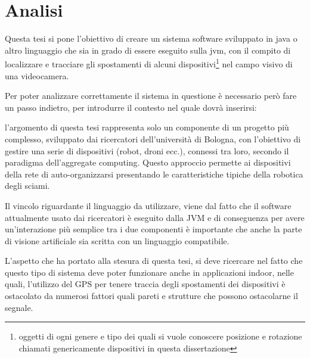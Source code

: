 \documentclass[12pt,a4paper,openright,twoside]{book}
\begin{document}
\chapter{Analisi}
Questa tesi si pone l'obiettivo di creare un sistema software sviluppato in java o altro linguaggio che sia in grado di essere eseguito sulla \acrfull{jvm}, con il compito di localizzare e tracciare gli spostamenti di alcuni dispositivi\footnote{oggetti di ogni genere e tipo dei quali si vuole conoscere posizione e rotazione chiamati genericamente dispositivi in questa dissertazione} nel campo visivo di una videocamera.

Per poter analizzare correttamente il sistema in questione è necessario però fare un passo indietro, per introdurre il contesto nel quale dovrà inserirsi:
\begin{adjustwidth}{1cm}{0cm}
l'argomento di questa tesi rappresenta solo un componente di un progetto più complesso, sviluppato dai ricercatori dell'università di Bologna, con l'obiettivo di gestire una serie di dispositivi (robot, droni ecc.), connessi tra loro, secondo il paradigma dell'aggregate computing.
Questo approccio permette ai dispositivi della rete di auto-organizzarsi presentando le caratteristiche tipiche della robotica degli sciami.

Il vincolo riguardante il linguaggio da utilizzare, viene dal fatto che il software attualmente usato dai ricercatori è eseguito dalla JVM e di conseguenza per avere un'interazione più semplice tra i due componenti è importante che anche la parte di visione artificiale sia scritta con un linguaggio compatibile.
\end{adjustwidth}

L'aspetto che ha portato alla stesura di questa tesi, si deve ricercare nel fatto che questo tipo di sistema deve poter funzionare anche in applicazioni indoor, nelle quali, l'utilizzo del GPS per tenere traccia degli spostamenti dei dispositivi è ostacolato da numerosi fattori quali pareti e strutture che possono ostacolarne il segnale.


\end{document}
